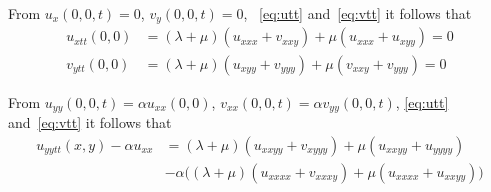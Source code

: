 From $u_x(0,0,t)=0$, $v_y(0,0,t)=0$, ~\eqref{eq:utt} and~\eqref{eq:vtt} it follows that
\begin{align}
   u_{xtt}(0,0) &= (\lambda+\mu)(u_{xxx} + v_{xxy}) + \mu(u_{xxx} + u_{xyy}) =0 \\
   v_{ytt}(0,0) &= (\lambda+\mu)(u_{xyy} + v_{yyy}) + \mu(v_{xxy} + v_{yyy}) =0
\end{align}


From $u_{yy}(0,0,t)=\alpha u_{xx}(0,0)$, $v_{xx}(0,0,t) = \alpha v_{yy}(0,0,t)$,
\eqref{eq:utt} and~\eqref{eq:vtt} it follows that
\begin{align}
   u_{yytt}(x,y)-\alpha u_{xx} &= (\lambda+\mu)(u_{xxyy} + v_{xyyy}) + \mu(u_{xxyy} + u_{yyyy}) \\
               & -\alpha\Big( (\lambda+\mu)(u_{xxxx} + v_{xxxy}) + \mu(u_{xxxx} + u_{xxyy}) \Big) 
\end{align}

